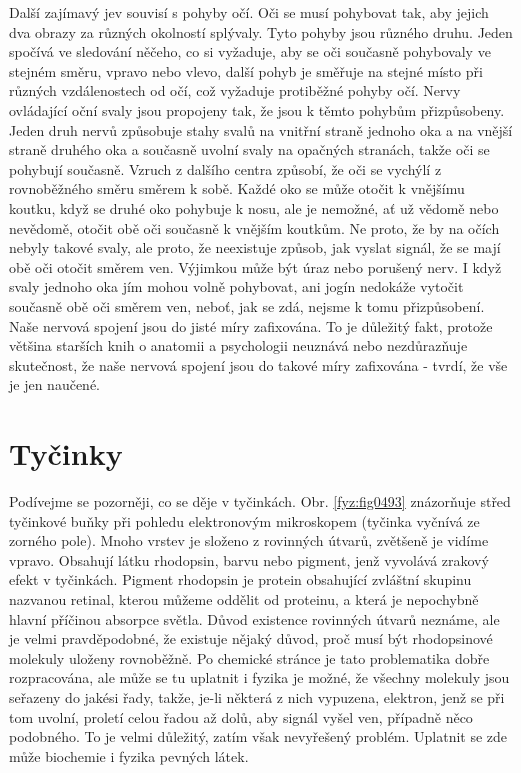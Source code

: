     Další zajímavý jev souvisí s pohyby očí. Oči se musí pohybovat tak, aby jejich dva obrazy za
    různých okolností splývaly. Tyto pohyby jsou různého druhu. Jeden spočívá ve sledování něčeho,
    co si vyžaduje, aby se oči současně pohybovaly ve stejném směru, vpravo nebo vlevo, další pohyb
    je směřuje na stejné místo při různých vzdálenostech od očí, což vyžaduje protiběžné pohyby očí.
    Nervy ovládající oční svaly jsou propojeny tak, že jsou k těmto pohybům přizpůsobeny. Jeden druh
    nervů způsobuje stahy svalů na vnitřní straně jednoho oka a na vnější straně druhého oka a
    současně uvolní svaly na opačných stranách, takže oči se pohybují současně. Vzruch z dalšího
    centra způsobí, že oči se vychýlí z rovnoběžného směru směrem k sobě. Každé oko se může otočit k
    vnějšímu koutku, když se druhé oko pohybuje k nosu, ale je nemožné, ať už vědomě nebo nevědomě,
    otočit obě oči současně k vnějším koutkům. Ne proto, že by na očích nebyly takové svaly, ale
    proto, že neexistuje způsob, jak vyslat signál, že se mají obě oči otočit směrem ven. Výjimkou
    může být úraz nebo porušený nerv. I když svaly jednoho oka jím mohou volně pohybovat, ani jogín
    nedokáže vytočit současně obě oči směrem ven, neboť, jak se zdá, nejsme k tomu přizpůsobení.
    Naše nervová spojení jsou do jisté míry zafixována. To je důležitý fakt, protože většina starších
    knih o anatomii a psychologii neuznává nebo nezdůrazňuje skutečnost, že naše nervová spojení
    jsou do takové míry zafixována - tvrdí, že vše je jen naučené.

  \section{Tyčinky}\label{fyz:IchapXXXVIsecIII}
    Podívejme se pozorněji, co se děje v tyčinkách. Obr. \ref{fyz:fig0493} znázorňuje střed tyčinkové
    buňky při pohledu elektronovým mikroskopem (tyčinka vyčnívá ze zorného pole). Mnoho vrstev je
    složeno z rovinných útvarů, zvětšeně je vidíme vpravo. Obsahují látku rhodopsin, barvu nebo
    pigment, jenž vyvolává zrakový efekt v tyčinkách. Pigment rhodopsin je protein obsahující
    zvláštní skupinu  nazvanou retinal, kterou můžeme oddělit od proteinu, a která je nepochybně
    hlavní příčinou absorpce světla. Důvod existence rovinných útvarů neznáme, ale je velmi
    pravděpodobné, že existuje nějaký důvod, proč musí být rhodopsinové molekuly uloženy rovnoběžně.
    Po chemické stránce je tato problematika dobře rozpracována, ale může se tu uplatnit i fyzika je
    možné, že všechny molekuly jsou seřazeny do jakési řady, takže, je-li některá z nich vypuzena,
    elektron, jenž se při tom uvolní, proletí celou řadou až dolů, aby signál vyšel ven, případně
    něco podobného. To je velmi důležitý, zatím však nevyřešený problém. Uplatnit se zde může
    biochemie i fyzika pevných látek.

